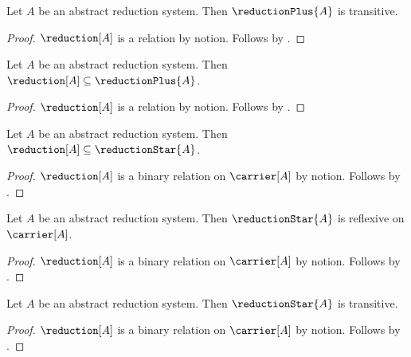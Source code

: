 \begin{proposition}\label{reduction_plus_is_transitive}
    Let $A$ be an abstract reduction system.
    Then $\reductionPlus{A}$ is transitive.
\end{proposition}
\begin{proof}
    $\reduction[A]$ is a relation by notion.
    Follows by .
\end{proof}

\begin{proposition}\label{reduction_subseteq_reduction_plus}
    Let $A$ be an abstract reduction system.
    Then $\reduction[A]\subseteq\reductionPlus{A}$.
\end{proposition}
\begin{proof}
    $\reduction[A]$ is a relation by notion.
    Follows by .
\end{proof}

\begin{proposition}\label{reduction_subseteq_reduction_star}
    Let $A$ be an abstract reduction system.
    Then $\reduction[A]\subseteq\reductionStar{A}$.
\end{proposition}
\begin{proof}
    $\reduction[A]$ is a binary relation on $\carrier[A]$ by notion.
    Follows by .
\end{proof}

\begin{proposition}\label{reduction_star_is_reflexive}
    Let $A$ be an abstract reduction system.
    Then $\reductionStar{A}$ is reflexive on $\carrier[A]$.
\end{proposition}
\begin{proof}
    $\reduction[A]$ is a binary relation on $\carrier[A]$ by notion.
    Follows by .
\end{proof}

\begin{proposition}\label{reduction_star_is_transitive}
    Let $A$ be an abstract reduction system.
    Then $\reductionStar{A}$ is transitive.
\end{proposition}
\begin{proof}
    $\reduction[A]$ is a binary relation on $\carrier[A]$ by notion.
    Follows by .
\end{proof}

